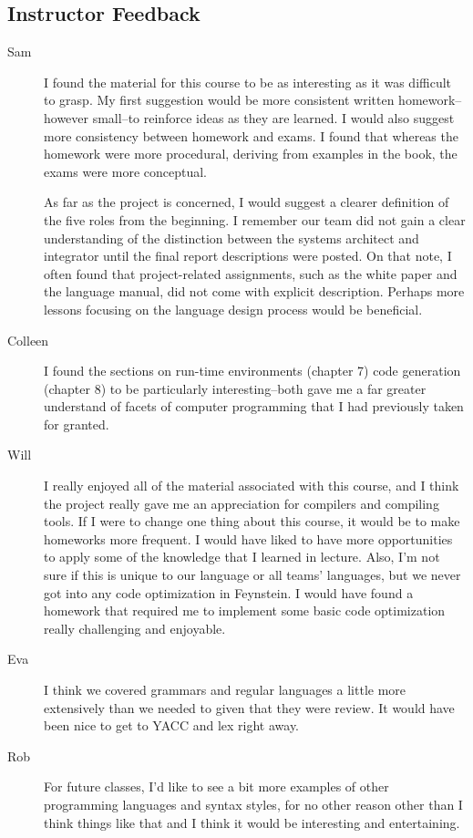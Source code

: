 \subsection{Instructor Feedback}
\begin{description}
\item[Sam] I found the material for this course to be as interesting
  as it was difficult to grasp. My first suggestion would be more
  consistent written homework--however small--to reinforce ideas as
  they are learned. I would also suggest more consistency between
  homework and exams. I found that whereas the homework were more
  procedural, deriving from examples in the book, the exams were more
  conceptual.

  As far as the project is concerned, I would suggest a clearer
  definition of the five roles from the beginning. I remember our team
  did not gain a clear understanding of the distinction between the
  systems architect and integrator until the final report descriptions
  were posted. On that note, I often found that project-related
  assignments, such as the white paper and the language manual, did
  not come with explicit description. Perhaps more lessons focusing on
  the language design process would be beneficial.

\item[Colleen] I found the sections on run-time environments (chapter
  7) code generation (chapter 8) to be particularly interesting--both
  gave me a far greater understand of facets of computer programming
  that I had previously taken for granted.

\item[Will] I really enjoyed all of the material associated with this
  course, and I think the project really gave me an appreciation for
  compilers and compiling tools. If I were to change one thing about
  this course, it would be to make homeworks more frequent. I would
  have liked to have more opportunities to apply some of the knowledge
  that I learned in lecture. Also, I'm not sure if this is unique to
  our language or all teams' languages, but we never got into any code
  optimization in Feynstein. I would have found a homework that
  required me to implement some basic code optimization really
  challenging and enjoyable.

\item[Eva] I think we covered grammars and regular languages a little
  more extensively than we needed to given that they were review. It
  would have been nice to get to YACC and lex right away.

\item[Rob] For future classes, I'd like to see a bit more examples of
  other programming languages and syntax styles, for no other reason
  other than I think things like that and I think it would be
  interesting and entertaining.
\end{description}
